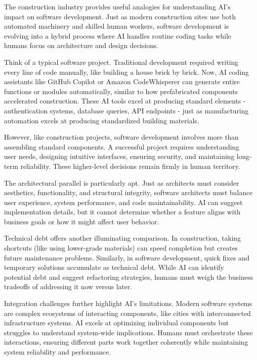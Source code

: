 \documentclass[
  Letterpaper,
]{scrbook}
\begin{document}
The construction industry provides useful analogies for understanding
AI's impact on software development. Just as modern construction sites
use both automated machinery and skilled human workers, software
development is evolving into a hybrid process where AI handles routine
coding tasks while humans focus on architecture and design decisions.

Think of a typical software project. Traditional development required
writing every line of code manually, like building a house brick by
brick. Now, AI coding assistants like GitHub Copilot or Amazon
CodeWhisperer can generate entire functions or modules automatically,
similar to how prefabricated components accelerated construction. These
AI tools excel at producing standard elements - authentication systems,
database queries, API endpoints - just as manufacturing automation
excels at producing standardized building materials.

However, like construction projects, software development involves more
than assembling standard components. A successful project requires
understanding user needs, designing intuitive interfaces, ensuring
security, and maintaining long-term reliability. These higher-level
decisions remain firmly in human territory.

The architectural parallel is particularly apt. Just as architects must
consider aesthetics, functionality, and structural integrity, software
architects must balance user experience, system performance, and code
maintainability. AI can suggest implementation details, but it cannot
determine whether a feature aligns with business goals or how it might
affect user behavior.

Technical debt offers another illuminating comparison. In construction,
taking shortcuts (like using lower-grade materials) can speed completion
but creates future maintenance problems. Similarly, in software
development, quick fixes and temporary solutions accumulate as technical
debt. While AI can identify potential debt and suggest refactoring
strategies, humans must weigh the business tradeoffs of addressing it
now versus later.

Integration challenges further highlight AI's limitations. Modern
software systems are complex ecosystems of interacting components, like
cities with interconnected infrastructure systems. AI excels at
optimizing individual components but struggles to understand system-wide
implications. Humans must orchestrate these interactions, ensuring
different parts work together coherently while maintaining system
reliability and performance.
\end{document}
